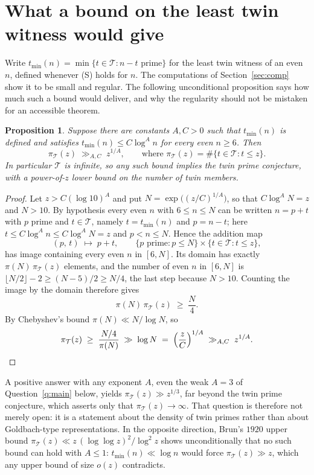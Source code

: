 \documentclass[10pt]{article}
\newtheorem{proposition}{Proposition}
\theoremstyle{definition}
\theoremstyle{remark}
\newcommand{\T}{\mathcal{T}}
\begin{document}
\section{What a bound on the least twin witness would give}\label{sec:hard}

Write $t_{\min}(n) = \min\{t \in \T : n - t \text{ prime}\}$ for the least
twin witness of an even $n$, defined whenever (S) holds for $n$. The
computations of Section~\ref{sec:comp} show it to be small and regular. The
following unconditional proposition says how much such a bound would deliver,
and why the regularity should not be mistaken for an accessible theorem.

\begin{proposition}\label{prop:hard}
Suppose there are constants $A, C > 0$ such that $t_{\min}(n)$ is defined
and satisfies $t_{\min}(n) \le C\log^A n$ for every even $n \ge 6$. Then
\[
\pi_\T(z) \;\gg_{A,C}\; z^{1/A},
\qquad\text{where } \pi_\T(z) = \#\{t \in \T : t \le z\}.
\]
In particular $\T$ is infinite, so any such bound implies the twin prime
conjecture, with a power-of-$z$ lower bound on the number of twin members.
\end{proposition}

\begin{proof}
Let $z > C(\log 10)^A$ and put $N = \exp\bigl((z/C)^{1/A}\bigr)$, so that
$C\log^A N = z$ and $N > 10$. By hypothesis every even $n$ with
$6 \le n \le N$ can be written $n = p + t$ with $p$ prime and $t \in \T$,
namely $t = t_{\min}(n)$ and $p = n - t$; here
$t \le C\log^A n \le C \log^A N = z$ and $p < n \le N$. Hence the
addition map
\[
(p,\,t) \;\longmapsto\; p + t, \qquad
\{p \text{ prime}: p \le N\} \times \{t \in \T : t \le z\},
\]
has image containing every even $n$ in $[6, N]$. Its domain has exactly
$\pi(N)\,\pi_\T(z)$ elements, and the number of even $n$ in $[6, N]$ is
$\lfloor N/2 \rfloor - 2 \ge (N-5)/2 \ge N/4$, the last step because
$N > 10$. Counting the image by the domain therefore gives
\[
\pi(N)\,\pi_\T(z) \;\ge\; \frac{N}{4}.
\]
By Chebyshev's bound $\pi(N) \ll N/\log N$, so
\[
\pi_\T(z) \;\ge\; \frac{N/4}{\pi(N)} \;\gg\; \log N
\;=\; \Bigl(\frac{z}{C}\Bigr)^{1/A} \;\gg_{A,C}\; z^{1/A}. \qedhere
\]
\end{proof}

A positive answer with any exponent $A$, even the weak $A = 3$ of
Question~\ref{q:main} below, yields $\pi_\T(z) \gg z^{1/3}$, far beyond the
twin prime conjecture, which asserts only that $\pi_\T(z) \to \infty$. That
question is therefore not merely open: it is a statement about the density of
twin primes rather than about Goldbach-type representations. In the opposite
direction, Brun's $1920$ upper bound
$\pi_\T(z) \ll z\,(\log\log z)^2/\log^2 z$ \cite{Brun} shows unconditionally
that no such bound can hold with $A \le 1$: $t_{\min}(n) \ll \log n$ would
force $\pi_\T(z) \gg z$, which any upper bound of size $o(z)$ contradicts.
\end{document}
